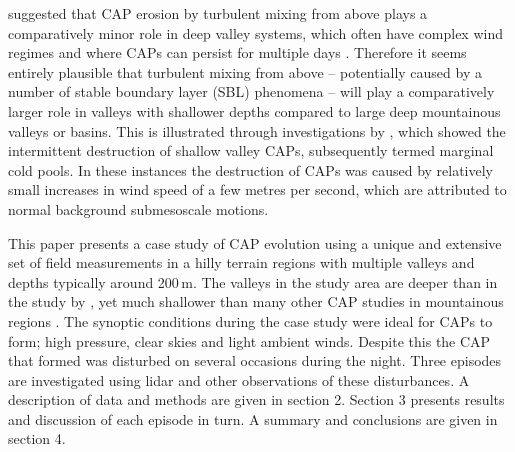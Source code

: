 \documentclass[times]{qjrms4}
\begin{document}
\citet{zangl2005dynamical} suggested that CAP erosion by turbulent mixing from above plays a comparatively minor role in deep valley systems, which often have complex wind regimes and where CAPs can persist for multiple days \citep{whiteman2001cold}. Therefore it seems entirely plausible that turbulent mixing from above -- potentially caused by a number of stable boundary layer (SBL) phenomena -- will play a comparatively larger role in valleys with shallower depths compared to large deep mountainous valleys or basins. This is illustrated through investigations by \citet{mahrt2015common}, which showed the intermittent destruction of shallow valley CAPs, subsequently termed marginal cold pools. In these instances the destruction of CAPs was caused by relatively small increases in wind speed of a few metres per second, which are attributed to normal background submesoscale motions.

This paper presents a case study of CAP evolution using a unique and extensive set of field measurements in a hilly terrain regions with multiple valleys and depths typically around 200$\,\mbox{m}$. The valleys in the study area are deeper than in the study by \citet{mahrt2015common}, yet much shallower than many other CAP studies in mountainous regions \citep[e.g.][]{whiteman2001cold,zangl2005dynamical,lareauetal2013persist}. The synoptic conditions during the case study were ideal for CAPs to form; high pressure, clear skies and light ambient winds. Despite this the CAP that formed was disturbed on several occasions during the night. Three episodes are investigated using lidar and other observations of these disturbances. A description of data and methods are given in section 2. Section 3 presents results and discussion of each episode in turn. A summary and conclusions are given in section 4.
\end{document}
